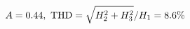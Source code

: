 \documentclass[preview]{standalone}
\begin{document}
\begin{align*}
\special{dvisvgm:raw <g id='unique000'>}A=0.44,\ \text{THD}=\sqrt{H_2^2+H_3^2}/H_1=8.6\%\special{dvisvgm:raw </g>}
\end{align*}
\end{document}
